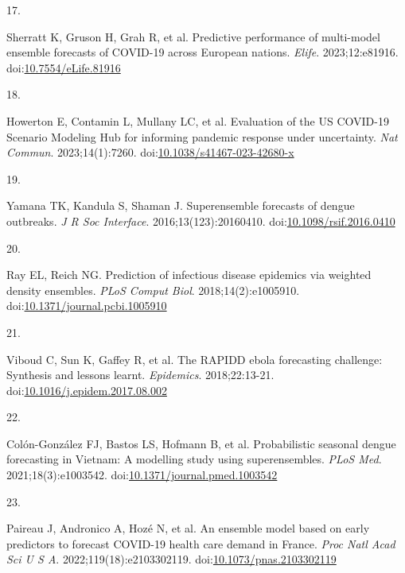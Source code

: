 \documentclass[
]{article}
\newlength{\cslhangindent}
\newlength{\csllabelwidth}
\newenvironment{CSLReferences}[2] %
 {\begin{list}{}{%
  \setlength{\itemindent}{0pt}
  \setlength{\leftmargin}{0pt}
  \setlength{\parsep}{0pt}
  \ifodd #1
   \setlength{\leftmargin}{\cslhangindent}
   \setlength{\itemindent}{-1\cslhangindent}
  \fi
  \setlength{\itemsep}{#2\baselineskip}}}
 {\end{list}}
\newcommand{\CSLLeftMargin}[1]{\parbox[t]{\csllabelwidth}{\strut#1\strut}}
\newcommand{\CSLRightInline}[1]{\parbox[t]{\linewidth - \csllabelwidth}{\strut#1\strut}}
\begin{document}
\begin{CSLReferences}{0}{1}
\CSLLeftMargin{17. }%
\CSLRightInline{Sherratt K, Gruson H, Grah R, et al. Predictive
performance of multi-model ensemble forecasts of {COVID}-19 across
{European} nations. \emph{Elife}. 2023;12:e81916.
doi:\href{https://doi.org/10.7554/eLife.81916}{10.7554/eLife.81916}}

\CSLLeftMargin{18. }%
\CSLRightInline{Howerton E, Contamin L, Mullany LC, et al. Evaluation of
the {US} {COVID}-19 {Scenario} {Modeling} {Hub} for informing pandemic
response under uncertainty. \emph{Nat Commun}. 2023;14(1):7260.
doi:\href{https://doi.org/10.1038/s41467-023-42680-x}{10.1038/s41467-023-42680-x}}

\CSLLeftMargin{19. }%
\CSLRightInline{Yamana TK, Kandula S, Shaman J. Superensemble forecasts
of dengue outbreaks. \emph{J R Soc Interface}. 2016;13(123):20160410.
doi:\href{https://doi.org/10.1098/rsif.2016.0410}{10.1098/rsif.2016.0410}}

\CSLLeftMargin{20. }%
\CSLRightInline{Ray EL, Reich NG. Prediction of infectious disease
epidemics via weighted density ensembles. \emph{PLoS Comput Biol}.
2018;14(2):e1005910.
doi:\href{https://doi.org/10.1371/journal.pcbi.1005910}{10.1371/journal.pcbi.1005910}}

\CSLLeftMargin{21. }%
\CSLRightInline{Viboud C, Sun K, Gaffey R, et al. The RAPIDD ebola
forecasting challenge: Synthesis and lessons learnt. \emph{Epidemics}.
2018;22:13-21.
doi:\href{https://doi.org/10.1016/j.epidem.2017.08.002}{10.1016/j.epidem.2017.08.002}}

\CSLLeftMargin{22. }%
\CSLRightInline{Colón-González FJ, Bastos LS, Hofmann B, et al.
Probabilistic seasonal dengue forecasting in {Vietnam}: {A} modelling
study using superensembles. \emph{PLoS Med}. 2021;18(3):e1003542.
doi:\href{https://doi.org/10.1371/journal.pmed.1003542}{10.1371/journal.pmed.1003542}}

\CSLLeftMargin{23. }%
\CSLRightInline{Paireau J, Andronico A, Hozé N, et al. An ensemble model
based on early predictors to forecast {COVID}-19 health care demand in
{France}. \emph{Proc Natl Acad Sci U S A}. 2022;119(18):e2103302119.
doi:\href{https://doi.org/10.1073/pnas.2103302119}{10.1073/pnas.2103302119}}


\end{CSLReferences}
\end{document}
